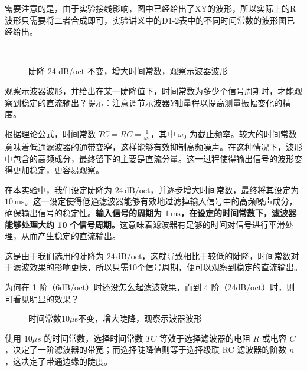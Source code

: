 \documentclass[dvipsnames, svgnames,a4paper,11pt]{article}
\begin{document}
需要注意的是，由于实验接线影响，图中已经给出了XY的波形，所以实际上的R波形只需要将二者合成即可，实验讲义中的D1-2表中的不同时间常数的波形图已经给出。
\begin{figure}[htbp]
	\centering
	\quad
	\quad
	\\

	\quad
	\quad
	\caption{陡降 24 dB/oct 不变，增大时间常数，观察示波器波形}
	\label{fig:time_constant_effect}
\end{figure}
\begin{question}
	观察示波器波形，并给出在某一陡降值下，时间常数为多少个信号周期时，才能观
察到稳定的直流输出？提示：注意调节示波器$Y$轴量程以提高测量振幅变化的精度。
\end{question}
根据理论公式，时间常数 \( TC = RC = \frac{1}{\omega_0} \)，其中 \( \omega_0 \) 为截止频率。较大的时间常数意味着低通滤波器的通带变窄，这样能够有效抑制高频噪声。在这种情况下，波形中包含的高频成分，最终留下的主要是直流分量。这一过程使得输出信号的波形变得更加稳定，更容易观察。

在本实验中，我们设定陡降为 \( 24 \, \text{dB/oct} \)，并逐步增大时间常数，最终将其设定为 \( 10 \, \text{ms} \)。这一设定使得低通滤波器能够有效地过滤掉输入信号中的高频噪声成分，确保输出信号的稳定性。\textbf{输入信号的周期为 \( 1 \, \text{ms} \)，在设定的时间常数下，滤波器能够处理大约 10 个信号周期。}这意味着滤波器有足够的时间对信号进行平滑处理，从而产生稳定的直流输出。

这是由于我们选用的陡降为 \( 24 \, \text{dB/oct} \)，这就导致相比于较低的陡降，时间常数对于滤波效果的影响更快，所以只需10个信号周期，便可以观察到稳定的直流输出。
\begin{question}
	为何在 1 阶（6dB/oct）时还没怎么起滤波效果，而到 4 阶（24dB/oct）时，则可看见明显的效果？
\end{question}


	\begin{figure}[H]
		\centering
		\quad
		\quad
		\quad
		\quad
		\caption{时间常数10$\mu$s不变，增大陡降，观察示波器波形}
		\label{时间常数10μs不变，增大陡降，观察示波器波形}
		\end{figure}
		使用  $10\mu s$ 的时间常数，选择时间常数 \( TC \) 等效于选择滤波器的电阻 \( R \) 或电容 \( C \)，决定了一阶滤波器的带宽；而选择陡降值则等于选择级联 RC 滤波器的阶数 \( n \)，这决定了带通边缘的陡度。
\end{document}
